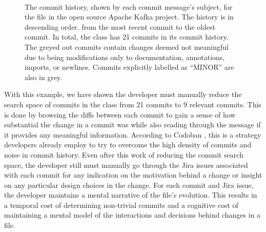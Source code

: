 \begin{figure}
\begin{RaggedRight}
	 \\
	\caption{The commit history, shown by each commit message's subject, for the  file in the open source Apache Kafka project. 		The history is in descending order, from the most recent commit to the oldest commit.
		In total, the  class has 21 commits in its commit history. The greyed out commits contain changes deemed not meaningful due 		to being modifications only to documentation, annotations, imports, or newlines. Commits explicitly labelled as ``MINOR'' are also in grey.}
	\label{fig:Topology-Commit-History}
\end{RaggedRight}
\end{figure}

With this example, we have shown the developer must manually reduce the search space of commits in the  class from 21 commits to 9 relevant commits. 
This is done by browsing the diffs between each commit to gain a sense of how substantial the change in a commit was while also reading through the message if it provides any meaningful information.
According to Codoban \etal \cite{codoban_software_2015}, this is a strategy developers already employ to try to overcome the high density of commits and noise in commit history. 
Even after this work of reducing the commit search space, the developer still must manually go through the Jira issues associated with each commit for any indication on the motivation behind a change or insight on any particular design choices in the change.
For each commit and Jira issue, the developer maintains a mental narrative of the file's evolution. 
This results in a temporal cost of determining non-trivial commits and a cognitive cost of maintaining a mental model of the interactions and decisions behind changes in a file.

